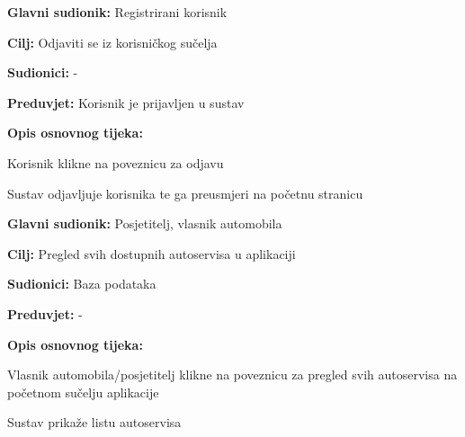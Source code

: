 \noindent {}
\begin{packed_item}
	
	\item \textbf{Glavni sudionik: } Registrirani korisnik
	\item  \textbf{Cilj:} Odjaviti se iz korisničkog sučelja
	\item  \textbf{Sudionici:} -
	\item  \textbf{Preduvjet:} Korisnik je prijavljen u sustav
	\item  \textbf{Opis osnovnog tijeka:}
	
	\item[] \begin{packed_enum}
		
		\item Korisnik klikne na poveznicu za odjavu
		\item Sustav odjavljuje korisnika te ga preusmjeri na početnu stranicu
	\end{packed_enum}
	
\end{packed_item}

\noindent {}
\begin{packed_item}
	
	\item \textbf{Glavni sudionik: } Posjetitelj, vlasnik automobila
	\item  \textbf{Cilj:} Pregled svih dostupnih autoservisa u aplikaciji
	\item  \textbf{Sudionici:} Baza podataka
	\item  \textbf{Preduvjet:} -
	\item  \textbf{Opis osnovnog tijeka:}
	
	\item[] \begin{packed_enum}
		
		\item Vlasnik automobila/posjetitelj klikne na poveznicu za pregled svih
		autoservisa na početnom sučelju aplikacije
		\item Sustav prikaže listu autoservisa
	\end{packed_enum}
	
\end{packed_item}

